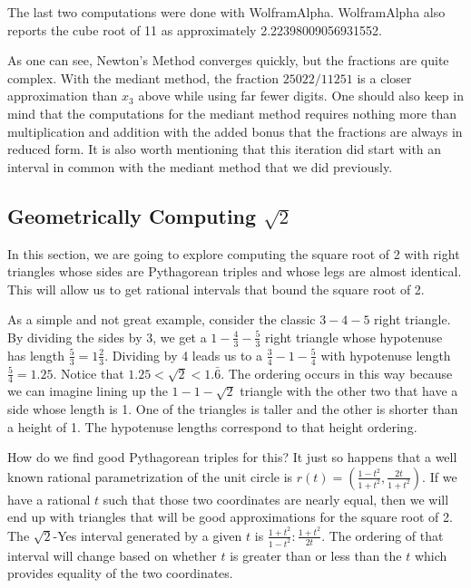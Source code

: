 \documentclass[12pt]{article}
\begin{document}
The last two computations were done with WolframAlpha.  WolframAlpha also reports the cube root of 11 as approximately 2.22398009056931552. 

As one can see, Newton's Method converges quickly, but the fractions are quite complex. With the mediant method, the fraction $25022/11251$ is a closer approximation than $x_3$ above while using far fewer digits. One should also keep in mind that the computations for the mediant method requires nothing more than multiplication and addition with the added bonus that the fractions are always in reduced form. It is also worth mentioning that this iteration did start with an interval in common with the mediant method that we did previously. 

\subsection{Geometrically Computing \texorpdfstring{$\sqrt{2}$}{sqrt2}}

In this section, we are going to explore computing the square root of 2 with right triangles whose sides are Pythagorean triples and whose legs are almost identical. This will allow us to get rational intervals that bound the square root of 2. 

As a simple and not great example, consider the classic $3-4-5$ right triangle. By dividing the sides by 3, we get a $1-\frac{4}{3}-\frac{5}{3}$ right triangle whose hypotenuse has length $\frac{5}{3} = 1 \frac{2}{3}$. Dividing by 4 leads us to a $\frac{3}{4}-1-\frac{5}{4}$ with hypotenuse  length $\frac{5}{4} = 1.25$. Notice that $1.25 < \sqrt{2} < 1.\bar{6}$.  The ordering occurs in this way because we can imagine lining up the $1-1-\sqrt{2}$ triangle with the other two that have a side whose length is 1. One of the triangles is taller and the other is shorter than a height of 1. The hypotenuse lengths correspond to that height ordering. 

How do we find good Pythagorean triples for this? It just so happens that a well known rational parametrization of the unit circle is  $r(t) = (\frac{1-t^2}{1+t^2}, \frac{2t}{1+t^2})$.  If we have a rational $t$ such that those two coordinates are nearly equal, then we will end up with triangles that will be good approximations for the square root of 2. The $\sqrt{2}$-Yes interval generated by a given $t$ is $\frac{1+t^2}{1-t^2}:\frac{1+t^2}{2t}$. The ordering of that interval will change based on whether $t$ is greater than or less than the $t$ which provides equality of the two coordinates. 
\end{document}
